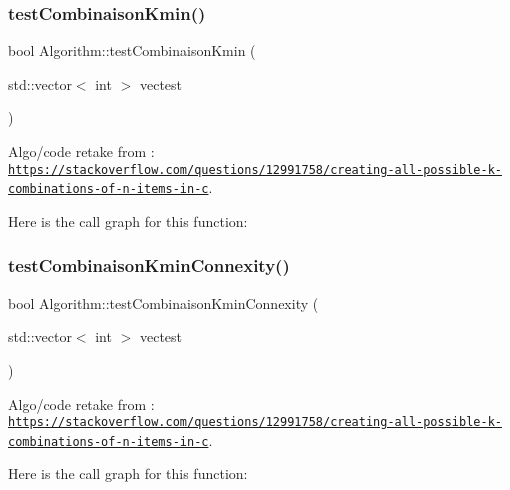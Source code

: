 \subsubsection{\texorpdfstring{test\+Combinaison\+Kmin()}{testCombinaisonKmin()}}
{\footnotesize\ttfamily bool Algorithm\+::test\+Combinaison\+Kmin (\begin{DoxyParamCaption}\item[{std\+::vector$<$ int $>$}]{vectest }\end{DoxyParamCaption})}



Algo/code retake from \+: \href{https://stackoverflow.com/questions/12991758/creating-all-possible-k-combinations-of-n-items-in-c}{\tt https\+://stackoverflow.\+com/questions/12991758/creating-\/all-\/possible-\/k-\/combinations-\/of-\/n-\/items-\/in-\/c}. 

Here is the call graph for this function\+:
\mbox{\label{struct_algorithm_a31e619f383dba963efffd210250b7eec}} 
\subsubsection{\texorpdfstring{test\+Combinaison\+Kmin\+Connexity()}{testCombinaisonKminConnexity()}}
{\footnotesize\ttfamily bool Algorithm\+::test\+Combinaison\+Kmin\+Connexity (\begin{DoxyParamCaption}\item[{std\+::vector$<$ int $>$}]{vectest }\end{DoxyParamCaption})}



Algo/code retake from \+: \href{https://stackoverflow.com/questions/12991758/creating-all-possible-k-combinations-of-n-items-in-c}{\tt https\+://stackoverflow.\+com/questions/12991758/creating-\/all-\/possible-\/k-\/combinations-\/of-\/n-\/items-\/in-\/c}. 

Here is the call graph for this function\+:
\mbox{\label{struct_algorithm_a0d7dc9d28bd602b2dbfa23bab74396c9}} 
